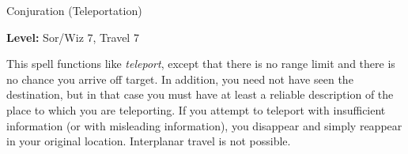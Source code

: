\label{spell:Greater Teleport}

Conjuration (Teleportation)

\textbf{Level:} Sor/Wiz 7, Travel 7

This spell functions like \textit{teleport}, except that there is no range limit 
and there is no chance you arrive off target. In addition, you need not have seen 
the destination, but in that case you must have at least a reliable description 
of the place to which you are teleporting. If you attempt to teleport with insufficient 
information (or with misleading information), you disappear and simply reappear 
in your original location. Interplanar travel is not possible.

